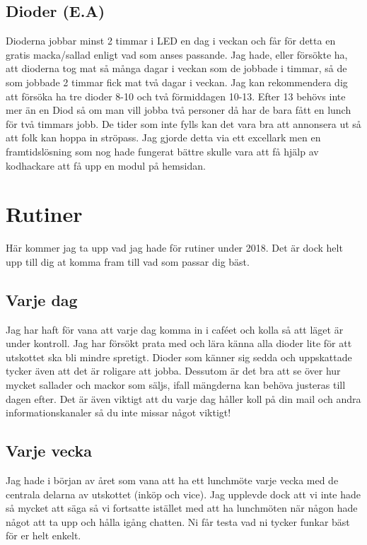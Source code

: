 \documentclass[10pt]{article}
\begin{document}
\subsection{Dioder (E.A)}
Dioderna jobbar minst 2 timmar i LED en dag i veckan och får för detta en gratis macka/sallad enligt vad som anses passande. Jag hade, eller försökte ha, att dioderna tog mat så många dagar i veckan som de jobbade i timmar, så de som jobbade 2 timmar fick mat två dagar i veckan. Jag kan rekommendera dig att försöka ha tre dioder 8-10 och två förmiddagen 10-13. Efter 13 behövs inte mer än en Diod så om man vill jobba två personer då har de bara fått en lunch för två timmars jobb. De tider som inte fylls kan det vara bra att annonsera ut så att folk kan hoppa in ströpass. Jag gjorde detta via ett excellark men en framtidslösning som nog hade fungerat bättre skulle vara att få hjälp av kodhackare att få upp en modul på hemsidan.

\section{Rutiner}
Här kommer jag ta upp vad jag hade för rutiner under 2018. Det är dock helt upp till dig at komma fram till vad som passar dig bäst.

\subsection{Varje dag}
Jag har haft för vana att varje dag komma in i caféet och kolla så att läget är under kontroll. Jag har försökt prata med och lära känna alla dioder lite för att utskottet ska bli mindre spretigt. Dioder som känner sig sedda och uppskattade tycker även att det är roligare att jobba. Dessutom är det bra att se över hur mycket sallader och mackor som säljs, ifall mängderna kan behöva justeras till dagen efter. Det är även viktigt att du varje dag håller koll på din mail och andra informationskanaler så du inte missar något viktigt!

\subsection{Varje vecka}
Jag hade i början av året som vana att ha ett lunchmöte varje vecka med de centrala delarna av utskottet (inköp och vice). Jag upplevde dock att vi inte hade så mycket att säga så vi fortsatte istället med att ha lunchmöten när någon hade något att ta upp och hålla igång chatten. Ni får testa vad ni tycker funkar bäst för er helt enkelt.
\end{document}
